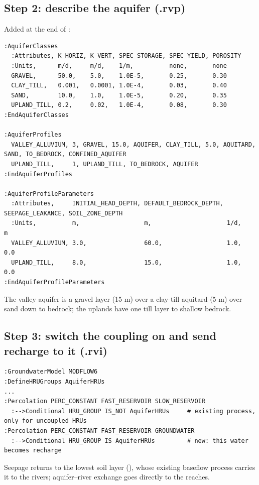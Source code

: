 \subsection{Step 2: describe the aquifer (.rvp)}
Added at the end of :
\begin{lstlisting}
:AquiferClasses
  :Attributes, K_HORIZ, K_VERT, SPEC_STORAGE, SPEC_YIELD, POROSITY
  :Units,      m/d,     m/d,    1/m,          none,       none
  GRAVEL,      50.0,    5.0,    1.0E-5,       0.25,       0.30
  CLAY_TILL,   0.001,   0.0001, 1.0E-4,       0.03,       0.40
  SAND,        10.0,    1.0,    1.0E-5,       0.20,       0.35
  UPLAND_TILL, 0.2,     0.02,   1.0E-4,       0.08,       0.30
:EndAquiferClasses

:AquiferProfiles
  VALLEY_ALLUVIUM, 3, GRAVEL, 15.0, AQUIFER, CLAY_TILL, 5.0, AQUITARD, SAND, TO_BEDROCK, CONFINED_AQUIFER
  UPLAND_TILL,     1, UPLAND_TILL, TO_BEDROCK, AQUIFER
:EndAquiferProfiles

:AquiferProfileParameters
  :Attributes,     INITIAL_HEAD_DEPTH, DEFAULT_BEDROCK_DEPTH, SEEPAGE_LEAKANCE, SOIL_ZONE_DEPTH
  :Units,          m,                  m,                     1/d,              m
  VALLEY_ALLUVIUM, 3.0,                60.0,                  1.0,              0.0
  UPLAND_TILL,     8.0,                15.0,                  1.0,              0.0
:EndAquiferProfileParameters
\end{lstlisting}
The valley aquifer is a gravel layer (15 m) over a clay-till aquitard (5 m) over sand down to bedrock; the uplands have one
till layer to shallow bedrock.

\subsection{Step 3: switch the coupling on and send recharge to it (.rvi)}
\par\noindent\begin{minipage}{\linewidth}
\begin{lstlisting}
:GroundwaterModel MODFLOW6
:DefineHRUGroups AquiferHRUs
...
:Percolation PERC_CONSTANT FAST_RESERVOIR SLOW_RESERVOIR
  :-->Conditional HRU_GROUP IS_NOT AquiferHRUs     # existing process, only for uncoupled HRUs
:Percolation PERC_CONSTANT FAST_RESERVOIR GROUNDWATER
  :-->Conditional HRU_GROUP IS AquiferHRUs         # new: this water becomes recharge
\end{lstlisting}
\end{minipage}\par\smallskip
Seepage returns to the lowest soil layer (), whose existing baseflow process carries it to the rivers;
aquifer--river exchange goes directly to the reaches.

